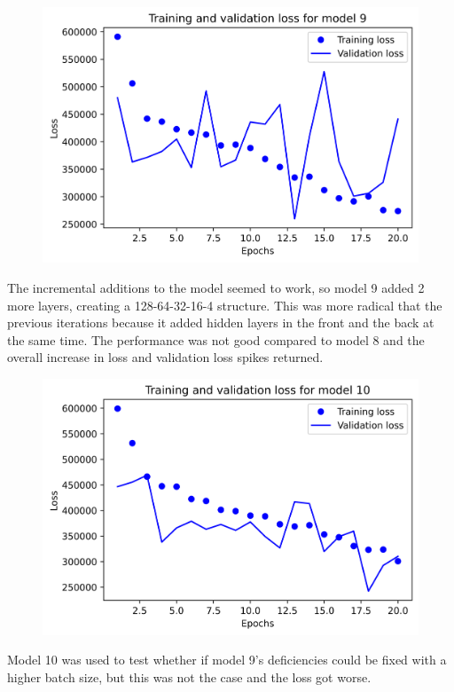 \documentclass{article}
\begin{document}
    \begin{figure}[H]
        \includegraphics[width=\linewidth]{images/model9.png}
    \end{figure}
    The incremental additions to the model seemed to work, so model 9 added 2 more layers, creating a 128-64-32-16-4 structure. 
    This was more radical that the previous iterations because it added hidden layers in the front and the back at the same time. 
    The performance was not good compared to model 8 and the overall increase in loss and validation loss spikes returned.

    \begin{figure}[H]
        \includegraphics[width=\linewidth]{images/model10.png}
    \end{figure}
    Model 10 was used to test whether if model 9's deficiencies could be fixed with a higher batch size, but this was not the case 
    and the loss got worse. 
\end{document}
